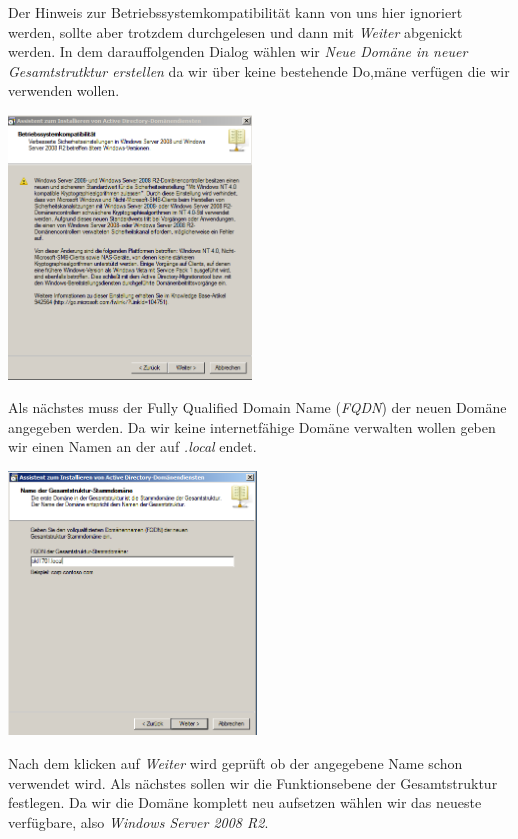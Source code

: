 \documentclass[12pt,a4paper,titlepage]{scrartcl} %
\begin{document}
Der Hinweis zur Betriebssystemkompatibilität kann von uns hier ignoriert werden, sollte aber trotzdem durchgelesen und dann mit \emph{Weiter} abgenickt werden. In dem darauffolgenden Dialog wählen wir \emph{Neue Domäne in neuer Gesamtstrutktur erstellen} da wir über keine bestehende Do,mäne verfügen die wir verwenden wollen.\\

	\begin{center}\includegraphics[height=7cm]{Bilder/015(dcpromo_exe02)}\\ \end{center}
	
Als nächstes muss der Fully Qualified Domain Name (\emph{FQDN}) der neuen Domäne angegeben werden. Da wir keine internetfähige Domäne verwalten wollen geben wir einen Namen an der auf \emph{.local} endet.\\

	\begin{center}\includegraphics[height=7cm]{Bilder/017(dcpromo_exe04)}\\ \end{center}
		
Nach dem klicken auf \emph{Weiter} wird geprüft ob der angegebene Name schon verwendet wird. Als nächstes sollen wir die Funktionsebene der Gesamtstruktur festlegen. Da wir die Domäne komplett neu aufsetzen wählen wir das neueste verfügbare, also \emph{Windows Server 2008 R2}.\\
\end{document}
